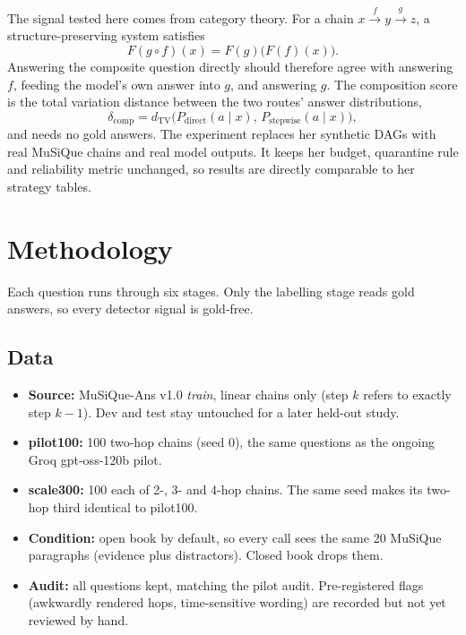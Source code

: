 \documentclass[11pt]{article}
\begin{document}
The signal tested here comes from category theory. For a chain
$x \xrightarrow{f} y \xrightarrow{g} z$, a structure-preserving system satisfies
\begin{equation}
  F(g \circ f)(x) = F(g)\bigl(F(f)(x)\bigr).
\end{equation}
Answering the composite question directly should therefore agree with answering $f$,
feeding the model's own answer into $g$, and answering $g$. The composition score is the
total variation distance between the two routes' answer distributions,
\begin{equation}
  \delta_{\text{comp}} = d_{\mathrm{TV}}\bigl(P_{\text{direct}}(a \mid x),\, P_{\text{stepwise}}(a \mid x)\bigr),
\end{equation}
and needs no gold answers. The experiment replaces her synthetic DAGs with real MuSiQue
chains and real model outputs. It keeps her budget, quarantine rule and reliability metric
unchanged, so results are directly comparable to her strategy tables.

\section{Methodology}

Each question runs through six stages. Only the labelling stage reads gold answers, so every
detector signal is gold-free.

\subsection{Data}
\begin{itemize}
  \item \textbf{Source:} MuSiQue-Ans v1.0 \emph{train}, linear chains only (step $k$ refers
        to exactly step $k-1$). Dev and test stay untouched for a later held-out study.
  \item \textbf{pilot100:} 100 two-hop chains (seed 0), the same questions as the ongoing
        Groq gpt-oss-120b pilot.
  \item \textbf{scale300:} 100 each of 2-, 3- and 4-hop chains. The same seed makes its
        two-hop third identical to pilot100.
  \item \textbf{Condition:} open book by default, so every call sees the same 20 MuSiQue
        paragraphs (evidence plus distractors). Closed book drops them.
  \item \textbf{Audit:} all questions kept, matching the pilot audit. Pre-registered flags
        (awkwardly rendered hops, time-sensitive wording) are recorded but not yet reviewed
        by hand.
\end{itemize}
\end{document}
